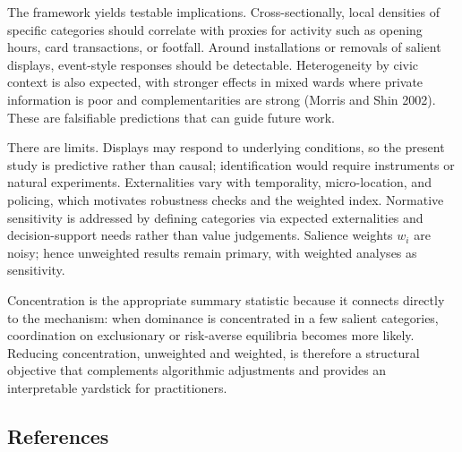 \documentclass[
  a4paper,
]{article}
\begin{document}
The framework yields testable implications. Cross-sectionally, local
densities of specific categories should correlate with proxies for
activity such as opening hours, card transactions, or footfall. Around
installations or removals of salient displays, event-style responses
should be detectable. Heterogeneity by civic context is also expected,
with stronger effects in mixed wards where private information is poor
and complementarities are strong (Morris and Shin 2002). These are
falsifiable predictions that can guide future work.

There are limits. Displays may respond to underlying conditions, so the
present study is predictive rather than causal; identification would
require instruments or natural experiments. Externalities vary with
temporality, micro-location, and policing, which motivates robustness
checks and the weighted index. Normative sensitivity is addressed by
defining categories via expected externalities and decision-support
needs rather than value judgements. Salience weights \(w_i\) are noisy;
hence unweighted results remain primary, with weighted analyses as
sensitivity.

Concentration is the appropriate summary statistic because it connects
directly to the mechanism: when dominance is concentrated in a few
salient categories, coordination on exclusionary or risk-averse
equilibria becomes more likely. Reducing concentration, unweighted and
weighted, is therefore a structural objective that complements
algorithmic adjustments and provides an interpretable yardstick for
practitioners.

\subsection{References}\label{references}
\end{document}
